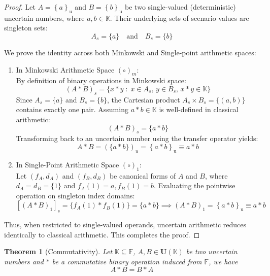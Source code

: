 \documentclass[a4paper,12pt,twoside]{memoir}
\newtheorem{theorem}{Theorem}[chapter]
\newcommand{\set}[1]{\left\{#1\right\}} %
\newcommand{\s}[1]{\set{#1}_\mathrm{u}} %
\newcommand{\tsbd}[1]{\mathbf{U}(\mathbb{#1})}
\newcommand{\kgdd}[1]{\left(#1\right)_1} %
\begin{document}
	\begin{proof}
		Let $A = \s{a}$ and $B = \s{b}$ be two single-valued (deterministic) uncertain numbers, where $a, b \in \mathbb{K}$. Their underlying sets of scenario values are singleton sets:
		\[
		A_s = \{a\} \quad \text{and} \quad B_s = \{b\}
		\]
		
		We prove the identity across both Minkowski and Single-point arithmetic spaces:
		
		\begin{enumerate}[leftmargin=*]
			\item In Minkowski Arithmetic Space $(\circ)_m$: \\
			By definition of binary operations in Minkowski space:
			\[
			(A * B)_s = \{x * y \;:\; x \in A_s, \, y \in B_s, \, x * y \in \mathbb{K}\}
			\]
			Since $A_s = \{a\}$ and $B_s = \{b\}$, the Cartesian product $A_s \times B_s = \{(a, b)\}$ contains exactly one pair. Assuming $a * b \in \mathbb{K}$ is well-defined in classical arithmetic:
			\[
			(A * B)_s = \{a * b\}
			\]
			Transforming back to an uncertain number using the transfer operator yields:
			\[
			A * B = (\{a * b\})_u = \s{a * b} \equiv a * b
			\]
			
			\item In Single-Point Arithmetic Space $(\circ)_1$: \\
			Let $(f_A, d_A)$ and $(f_B, d_B)$ be canonical forms of $A$ and $B$, where $d_A = d_B = \{1\}$ and $f_A(1) = a, f_B(1) = b$.
			Evaluating the pointwise operation on singleton index domains:
			\[
			[\kgdd{A * B}]_s = \{f_A(1) * f_B(1)\} = \{a * b\} \implies \kgdd{A * B} = \s{a * b} \equiv a * b
			\]
		\end{enumerate}
		
		Thus, when restricted to single-valued operands, uncertain arithmetic reduces identically to classical arithmetic. This completes the proof.
	\end{proof}
	\begin{theorem}[Commutativity]
		Let $\mathbb{K} \subseteq \mathbb{F}$, $A,B \in \tsbd{K}$ be two uncertain numbers and $*$ be a commutative binary operation induced from $\mathbb{F}$, we have
		$$A*B = B*A$$
	\end{theorem}
\end{document}
